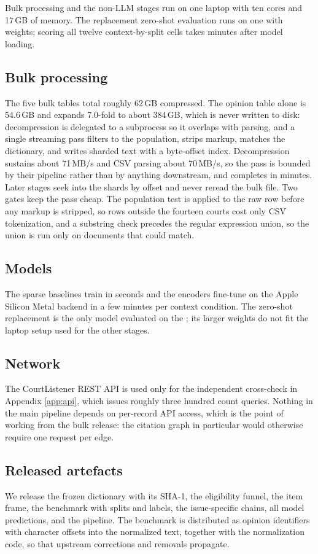 Bulk processing and the non-LLM stages run on one laptop with ten cores and
17\,GB of memory. The replacement zero-shot evaluation runs on one
\LLMDevice{} with \LLMDtype{} weights; scoring all twelve context-by-split
cells takes \LLMMinutes{} minutes after model loading.

\subsection{Bulk processing} The five bulk tables total roughly 62\,GB
compressed. The opinion table alone is 54.6\,GB and expands 7.0-fold to about
384\,GB, which is never written to disk: decompression is delegated to a
subprocess so it overlaps with parsing, and a single streaming pass filters to
the population, strips markup, matches the dictionary, and writes sharded text
with a byte-offset index. Decompression sustains about 71\,MB/s and CSV parsing
about 70\,MB/s, so the pass is bounded by their pipeline rather than by anything
downstream, and completes in \PassMinutes{} minutes. Later stages seek into the
shards by offset and never reread the bulk file. Two gates keep the pass cheap.
The population test is applied to the raw row before any markup is stripped, so
rows outside the fourteen courts cost only CSV tokenization, and a substring
check precedes the regular expression union, so the union is run only on
documents that could match.

\subsection{Models} The sparse baselines train in seconds and the encoders
fine-tune on the Apple Silicon Metal backend in a few minutes per context
condition. The zero-shot replacement is the only model evaluated on the
\LLMDevice{}; its larger weights do not fit the laptop setup used for the other
stages.

\subsection{Network} The CourtListener REST API is used only for the independent
cross-check in Appendix \ref{app:api}, which issues roughly three hundred count
queries. Nothing in the main pipeline depends on per-record API access, which is
the point of working from the bulk release: the citation graph in particular
would otherwise require one request per edge.

\subsection{Released artefacts} We release the frozen dictionary with its SHA-1,
the eligibility funnel, the item frame, the benchmark with splits and labels, the
issue-specific chains, all model predictions, and the pipeline. The benchmark is
distributed as opinion identifiers with character offsets into the normalized
text, together with the normalization code, so that upstream corrections and
removals propagate.
